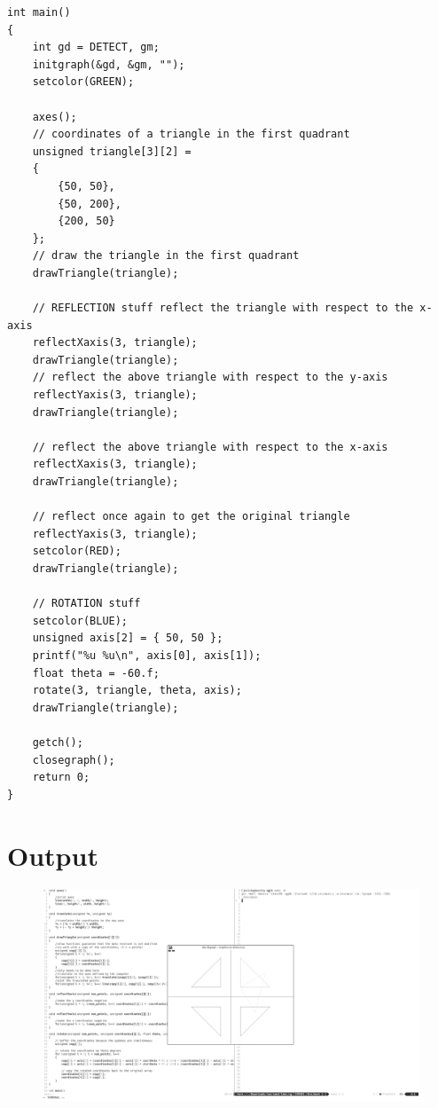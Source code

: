 \documentclass[12pt]{article}
\begin{document}
\begin{verbatim}
int main()
{
    int gd = DETECT, gm;
    initgraph(&gd, &gm, "");
    setcolor(GREEN);

    axes();
    // coordinates of a triangle in the first quadrant
    unsigned triangle[3][2] =
    {
        {50, 50},
        {50, 200},
        {200, 50}
    };
    // draw the triangle in the first quadrant 
    drawTriangle(triangle);

    // REFLECTION stuff reflect the triangle with respect to the x-axis
    reflectXaxis(3, triangle);
    drawTriangle(triangle);
    // reflect the above triangle with respect to the y-axis
    reflectYaxis(3, triangle);
    drawTriangle(triangle);

    // reflect the above triangle with respect to the x-axis
    reflectXaxis(3, triangle);
    drawTriangle(triangle);

    // reflect once again to get the original triangle
    reflectYaxis(3, triangle);
    setcolor(RED);
    drawTriangle(triangle);

    // ROTATION stuff
    setcolor(BLUE);
    unsigned axis[2] = { 50, 50 };
    printf("%u %u\n", axis[0], axis[1]);
    float theta = -60.f;
    rotate(3, triangle, theta, axis);
    drawTriangle(triangle);

    getch();
    closegraph();
    return 0;
}
\end{verbatim}
	\section{Output}

	\begin{figure}[!h]
		\hspace*{-1cm}
		\centering
		\includegraphics[width=1.01\linewidth]{output4.png}
		\caption{}
		\label{fig:}
	\end{figure}
\end{document}
